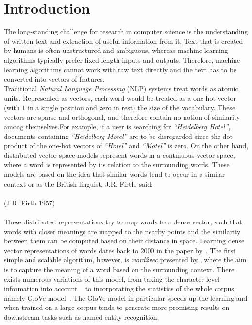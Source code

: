\chapter{Introduction}\label{chap:intro}
The long-standing challenge for research in computer science is the understanding of written text and extraction of useful information from it. Text that is created by humans is often unstructured and ambiguous, whereas machine learning algorithms typically prefer fixed-length inputs and outputs. Therefore, machine learning algorithms cannot work with raw text directly and the text has to be converted into vectors of features.
\\
Traditional \emph{Natural Language Processing} (NLP) systems treat words as atomic units. Represented as vectors, each word would be treated as a one-hot vector (with $1$ in a single position and zero in rest) the size of the vocabulary. These vectors are sparse and orthogonal, and therefore contain no notion of similarity among themselves.For example, if a user is searching for \emph{``Heidelberg Hotel''}, documents containing \emph{``Heidelberg Motel''} are to be disregarded since the dot product of the one-hot vectors of \emph{``Hotel''} and \emph{``Motel''} is zero. On the other hand, distributed vector space models represent words in a continuous vector space, where a word is represented by its relation to the surrounding words. These models are based on the idea that similar words tend to occur in a similar context or as the British linguist, J.R. Firth, said:\\ \\
\noindent
{} (J.R. Firth 1957)\\
\\
These distributed representations try to map words to a dense vector, such that words with closer meanings are mapped to the nearby points and the similarity between them can be computed based on their distance in space.
Learning dense vector representations of words dates back to $2000$ in the paper by~. The first simple and scalable algorithm, however, is \emph{word2vec} presented by , where the aim is to capture the meaning of a word based on the surrounding context. There exists numerous variations of this model, from taking the character level information into account ~ to incorporating the statistics of the whole corpus, namely GloVe model~. The GloVe model in particular speeds up the learning and when trained on a large corpus tends to generate more promising results on downstream tasks such as named entity recognition.\\

